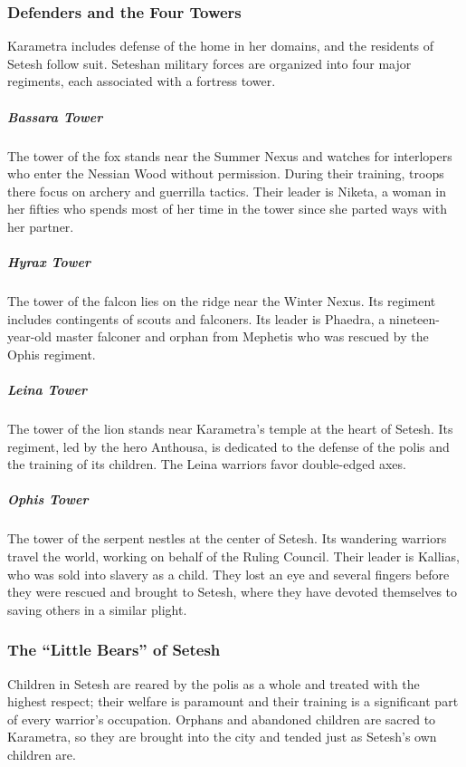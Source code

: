     \subsubsection{Defenders and the Four Towers}
        Karametra includes defense of the home in her domains, and the residents of Setesh follow suit.
        Seteshan military forces are organized into four major regiments, each associated with a fortress tower.

        \subparagraph{Bassara Tower} The tower of the fox stands near the Summer Nexus and watches for interlopers who enter the Nessian Wood without permission.
        During their training, troops there focus on archery and guerrilla tactics.
        Their leader is Niketa, a woman in her fifties who spends most of her time in the tower since she parted ways with her partner.

        \subparagraph{Hyrax Tower} The tower of the falcon lies on the ridge near the Winter Nexus.
        Its regiment includes contingents of scouts and falconers.
        Its leader is Phaedra, a nineteen-year-old master falconer and orphan from Mephetis who was rescued by the Ophis regiment.

        \subparagraph{Leina Tower} The tower of the lion stands near Karametra's temple at the heart of Setesh.
        Its regiment, led by the hero Anthousa, is dedicated to the defense of the polis and the training of its children.
        The Leina warriors favor double-edged axes.

        \subparagraph{Ophis Tower} The tower of the serpent nestles at the center of Setesh.
        Its wandering warriors travel the world, working on behalf of the Ruling Council.
        Their leader is Kallias, who was sold into slavery as a child.
        They lost an eye and several fingers before they were rescued and brought to Setesh, where they have devoted themselves to saving others in a similar plight.

    \subsubsection{The ``Little Bears'' of Setesh}
        Children in Setesh are reared by the polis as a whole and treated with the highest respect; their welfare is paramount and their training is a significant part of every warrior's occupation.
        Orphans and abandoned children are sacred to Karametra, so they are brought into the city and tended just as Setesh's own children are.

